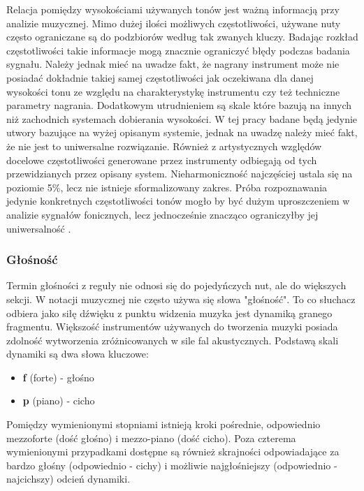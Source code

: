 \documentclass[12pt,a4paper,twoside]{mwart}
\begin{document}
Relacja pomiędzy wysokościami używanych tonów jest ważną informacją przy analizie muzycznej. Mimo dużej ilości możliwych częstotliwości, używane nuty często ograniczane są do podzbiorów według tak zwanych kluczy. Badając rozkład częstotliwości takie informacje mogą znacznie ograniczyć błędy podczas badania sygnału. Należy jednak mieć na uwadze fakt, że nagrany instrument może nie posiadać dokładnie takiej samej częstotliwości jak oczekiwana dla danej wysokości tonu ze względu na charakterystykę instrumentu czy też techniczne parametry nagrania. Dodatkowym utrudnieniem są skale które bazują na innych niż zachodnich systemach dobierania wysokości. W tej pracy badane będą jedynie utwory bazujące na wyżej opisanym systemie, jednak na uwadzę należy mieć fakt, że nie jest to uniwersalne rozwiązanie. Również z artystycznych względów docelowe częstotliwości generowane przez instrumenty odbiegają od tych przewidzianych przez opisany system. Nieharmoniczność najczęściej ustala się na poziomie 5\%, lecz nie istnieje sformalizowany zakres. Próba rozpoznawania jedynie konkretnych częstotliwości tonów mogło by być dużym uproszczeniem w analizie sygnałów fonicznych, lecz jednocześnie znacząco ograniczyłby jej uniwersalność \cite[64-65]{Homerecording:DlaKazdego} \cite[7-11]{Transcription:Anssi:SignalProcessingMethods}.

\subsubsection{Głośność}
Termin głośności z reguły nie odnosi się do pojedyńczych nut, ale do większych sekcji. W notacji muzycznej nie często używa się słowa "głośność". To co słuchacz odbiera jako siłę dźwięku z punktu widzenia muzyka jest dynamiką granego fragmentu. Większość instrumentów używanych do tworzenia muzyki posiada zdolność wytworzenia zróżnicowanych w sile fal akustycznych. Podstawą skali dynamiki są dwa słowa kluczowe:

\begin{itemize}
  \item \textbf{f} (forte) - głośno
  \item \textbf{p} (piano) - cicho
\end{itemize}

Pomiędzy wymienionymi stopniami istnieją kroki pośrednie, odpowiednio mezzo\-forte (dość głośno) i mezzo-piano (dość cicho). Poza czterema wymienionymi przypadkami dostępne są również skrajności odpowiadające za bardzo głośny (odpowiednio - cichy) i możliwie najgłośniejszy (odpowiednio - najcichszy) odcień dynamiki.
\end{document}
